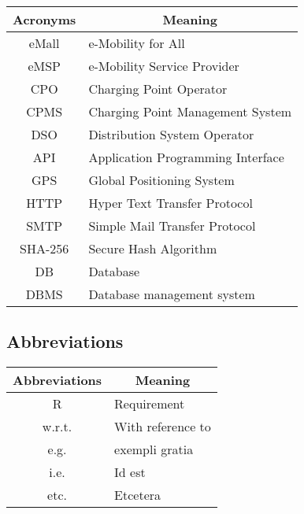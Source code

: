 \begin{table}[H]
\centering
\begin{tabular}{|c|l|}
\hline
\rowcolor[HTML]{B8C8D5} 
\textbf{Acronyms} & \multicolumn{1}{c|}{\cellcolor[HTML]{B8C8D5}\textbf{Meaning}} \\ \hline
eMall             & e-Mobility for All                                            \\ \hline
eMSP              & e-Mobility Service Provider                                   \\ \hline
CPO               & Charging Point Operator                                       \\ \hline
CPMS              & Charging Point Management System                              \\ \hline
DSO               & Distribution System Operator                                  \\ \hline
API               & Application Programming Interface                             \\ \hline
GPS               & Global Positioning System                                     \\ \hline
HTTP          & Hyper Text Transfer Protocol                           \\ \hline
SMTP          & Simple Mail Transfer Protocol                           \\ \hline
SHA-256           & Secure Hash Algorithm                                \\ \hline
DB                 & Database                                               \\ \hline
DBMS               & Database management system                                                 \\ \hline
\end{tabular}

\end{table}
\subsection{Abbreviations}

\begin{table}[H]
\centering
\begin{tabular}{|c|l|}
\hline
\rowcolor[HTML]{B8C8D5} 
\textbf{Abbreviations} & \multicolumn{1}{c|}{\cellcolor[HTML]{B8C8D5}\textbf{Meaning}} \\ \hline
R  & Requirement             \\ \hline
w.r.t. & With reference to \\ \hline
e.g. & exempli gratia \\ \hline
i.e. & Id est \\ \hline
etc. & Etcetera \\ \hline
\end{tabular}
\end{table}
\clearpage
